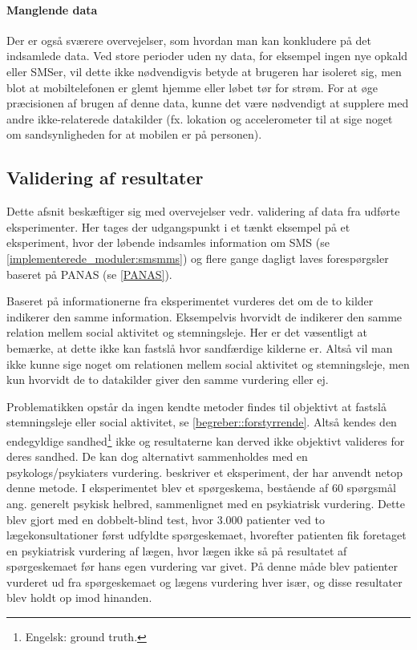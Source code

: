 \paragraph{Manglende data}
Der er også sværere overvejelser, som hvordan man kan konkludere på det indsamlede data.
Ved store perioder uden ny data, for eksempel ingen nye opkald eller SMSer, vil dette ikke nødvendigvis betyde at brugeren har isoleret sig, men blot at mobiltelefonen er glemt hjemme eller løbet tør for strøm.
For at øge præcisionen af brugen af denne data, kunne det være nødvendigt at supplere med andre ikke-relaterede datakilder (fx. lokation og accelerometer til at sige noget om sandsynligheden for at mobilen er på personen).

\subsection{Validering af resultater}\label{reflection:valid_resultater}
Dette afsnit beskæftiger sig med overvejelser vedr. validering af data fra udførte eksperimenter.
Her tages der udgangspunkt i et tænkt eksempel på et eksperiment, hvor der løbende indsamles information om SMS (se \cref{implementerede_moduler:smsmms}) og flere gange dagligt laves forespørgsler baseret på PANAS (se \cref{PANAS}).

Baseret på informationerne fra eksperimentet vurderes det om de to kilder indikerer den samme information.
Eksempelvis hvorvidt de indikerer den samme relation mellem social aktivitet og stemningsleje.
Her er det væsentligt at bemærke, at dette ikke kan fastslå hvor sandfærdige kilderne er.
Altså vil man ikke kunne sige noget om relationen mellem social aktivitet og stemningsleje, men kun hvorvidt de to datakilder giver den samme vurdering eller ej.

Problematikken opstår da ingen kendte metoder findes til objektivt at fastslå stemningsleje eller social aktivitet, se \cref{begreber::forstyrrende}.
Altså kendes den endegyldige sandhed\footnote{Engelsk: ground truth.} ikke og resultaterne kan derved ikke objektivt valideres for deres sandhed.
De kan dog alternativt sammenholdes med en psykologs/psykiaters vurdering.
 beskriver et eksperiment, der har anvendt netop denne metode.
I eksperimentet blev et spørgeskema, bestående af 60 spørgsmål ang. generelt psykisk helbred, sammenlignet med en psykiatrisk vurdering.
Dette blev gjort med en dobbelt-blind test, hvor 3.000 patienter ved to lægekonsultationer først udfyldte spørgeskemaet, hvorefter patienten fik foretaget en psykiatrisk vurdering af lægen, hvor lægen ikke så på resultatet af spørgeskemaet før hans egen vurdering var givet.
På denne måde blev patienter vurderet ud fra spørgeskemaet og lægens vurdering hver især, og disse resultater blev holdt op imod hinanden.

